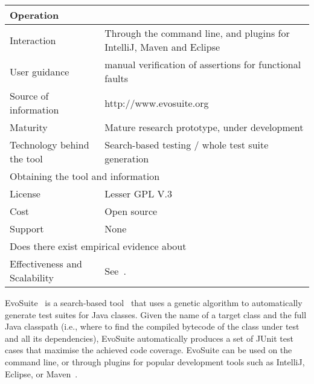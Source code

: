 \documentclass[10pt,conference]{IEEEtran}
\newcommand{\EVOSUITE}{{\sc EvoSuite}\xspace}
\begin{document}
\begin{table}[!h]
{\begin{tabular}{|l|p{5cm}|}
  \hline
  \multicolumn{2}{|l|}{Operation} \\
  \hline
  Interaction &  Through the command line, and plugins for IntelliJ, Maven and Eclipse\\
  User guidance &  manual verification of assertions for functional faults\\
  Source of information &  http://www.evosuite.org \\
  Maturity&  Mature research prototype, under development\\
  Technology behind the tool & Search-based testing / whole test suite generation\\
\hline
  \multicolumn{2}{|l|}{Obtaining the tool and information} \\
  \hline
License & Lesser GPL V.3\\
Cost & Open source\\
Support & None \\
\hline
\hline
  \multicolumn{2}{|l|}{Does there exist empirical evidence about} \\
  \hline
  Effectiveness and Scalability & See~\cite{GoA_TSE12,fraser2014large}. \\
\hline
\end{tabular}\vspace{-1em}
}
\end{table}


\EVOSUITE~\cite{FrA11c} is a search-based tool~\cite{GoA_TSE12} that
uses a genetic algorithm to automatically generate test suites for
Java classes. Given the name of a target class and the full Java
classpath (i.e., where to find the compiled bytecode of the class
under test and all its dependencies), \EVOSUITE automatically produces
a set of JUnit test cases that maximise the achieved code
coverage. \EVOSUITE can be used on the command line, or through
plugins for popular development tools such as IntelliJ, Eclipse, or Maven~\cite{ICST16_Tool}.
\end{document}
